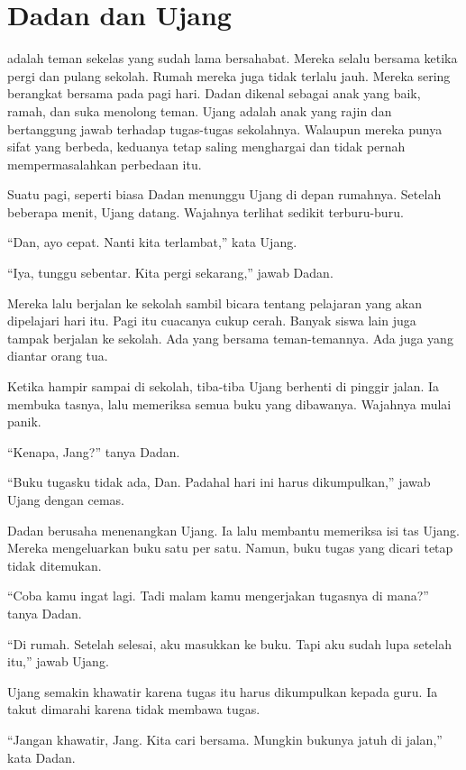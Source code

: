 \chapter*{Dadan dan Ujang}

 adalah teman sekelas yang sudah lama bersahabat. Mereka selalu bersama ketika pergi dan pulang sekolah. Rumah mereka juga tidak terlalu jauh. Mereka sering berangkat bersama pada pagi hari. Dadan dikenal sebagai anak yang baik, ramah, dan suka menolong teman. Ujang adalah anak yang rajin dan bertanggung jawab terhadap tugas-tugas sekolahnya. Walaupun mereka punya sifat yang berbeda, keduanya tetap saling menghargai dan tidak pernah mempermasalahkan perbedaan itu.

Suatu pagi, seperti biasa Dadan menunggu Ujang di depan rumahnya. Setelah beberapa menit, Ujang datang. Wajahnya terlihat sedikit terburu-buru.

``Dan, ayo cepat. Nanti kita terlambat,'' kata Ujang.

``Iya, tunggu sebentar. Kita pergi sekarang,'' jawab Dadan.

Mereka lalu berjalan ke sekolah sambil bicara tentang pelajaran yang akan dipelajari hari itu. Pagi itu cuacanya cukup cerah. Banyak siswa lain juga tampak berjalan ke sekolah. Ada yang bersama teman-temannya. Ada juga yang diantar orang tua.

Ketika hampir sampai di sekolah, tiba-tiba Ujang berhenti di pinggir jalan. Ia membuka tasnya, lalu memeriksa semua buku yang dibawanya. Wajahnya mulai panik.

``Kenapa, Jang?'' tanya Dadan.

``Buku tugasku tidak ada, Dan. Padahal hari ini harus dikumpulkan,'' jawab Ujang dengan cemas.

Dadan berusaha menenangkan Ujang. Ia lalu membantu memeriksa isi tas Ujang. Mereka mengeluarkan buku satu per satu. Namun, buku tugas yang dicari tetap tidak ditemukan.

``Coba kamu ingat lagi. Tadi malam kamu mengerjakan tugasnya di mana?'' tanya Dadan.

``Di rumah. Setelah selesai, aku masukkan ke buku. Tapi aku sudah lupa setelah itu,'' jawab Ujang.

Ujang semakin khawatir karena tugas itu harus dikumpulkan kepada guru. Ia takut dimarahi karena tidak membawa tugas.

``Jangan khawatir, Jang. Kita cari bersama. Mungkin bukunya jatuh di jalan,'' kata Dadan.

